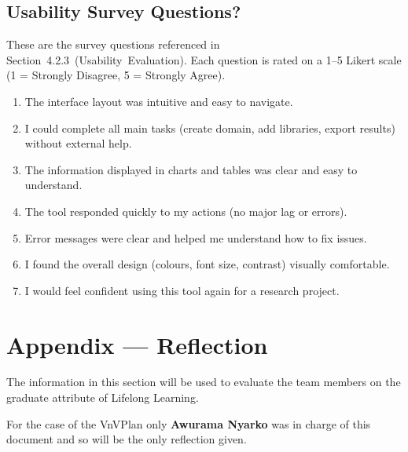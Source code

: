 \documentclass[12pt, titlepage]{article}
\begin{document}
\subsection{Usability Survey Questions?}
\label{sec:usability-survey}
These are the survey questions referenced in
Section~4.2.3~(Usability~Evaluation). Each question is rated on a 1–5
Likert scale (1 = Strongly Disagree, 5 = Strongly Agree).

\begin{enumerate}
  \item The interface layout was intuitive and easy to navigate.
  \item I could complete all main tasks (create domain, add libraries, export results) without external help.
  \item The information displayed in charts and tables was clear and easy to understand.
  \item The tool responded quickly to my actions (no major lag or errors).
  \item Error messages were clear and helped me understand how to fix issues.
  \item I found the overall design (colours, font size, contrast) visually comfortable.
  \item I would feel confident using this tool again for a research project.
\end{enumerate}

\newpage{}
\section*{Appendix --- Reflection}

The information in this section will be used to evaluate the team members on the
graduate attribute of Lifelong Learning. 




For the case of the VnVPlan only \textbf{Awurama Nyarko} was in charge of this document
and so will be the only reflection given.
\end{document}

